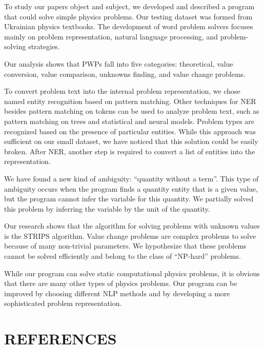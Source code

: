 \documentclass[a4paper, 12pt]{article}
\begin{document}
	To study our paper\textquotesingle s object and subject, we developed
	and described a program that could solve simple physics problems. Our
	testing dataset was formed from Ukrainian physics textbooks. The
	development of word problem solvers focuses mainly on problem
	representation, natural language processing, and problem-solving
	strategies.
	
	Our analysis shows that PWPs fall into five categories: theoretical,
	value conversion, value comparison, unknowns finding, and value change
	problems.
	
	To convert problem text into the internal problem representation, we
	chose named entity recognition based on pattern matching. Other
	techniques for NER besides pattern matching on tokens can be used to
	analyze problem text, such as pattern matching on trees and statistical
	and neural models. Problem types are recognized based on the presence of
	particular entities. While this approach was sufficient on our small
	dataset, we have noticed that this solution could be easily broken.
	After NER, another step is required to convert a list of entities into
	the representation.
	
	We have found a new kind of ambiguity: \enquote{quantity without a term}. This
	type of ambiguity occurs when the program finds a quantity entity that
	is a given value, but the program cannot infer the variable for this
	quantity. We partially solved this problem by inferring the variable by
	the unit of the quantity.
	
	Our research shows that the algorithm for solving problems with unknown
	values is the STRIPS algorithm. Value change problems are complex
	problems to solve because of many non-trivial parameters. We hypothesize
	that these problems cannot be solved efficiently and belong to the class
	of \enquote{NP-hard} problems.
	
	While our program can solve static computational physics problems, it is
	obvious that there are many other types of physics problems. Our program
	can be improved by choosing different NLP methods and by developing a
	more sophisticated problem representation.
	
	\section{REFERENCES}
	
	
	
\end{document}
